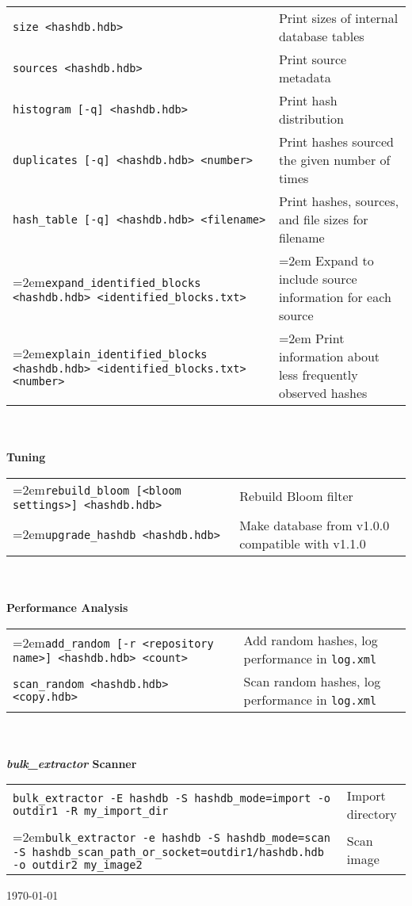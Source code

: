 \documentclass[12pt]{article}
\newcommand{\bulk}{\emph{bulk\_extractor}\xspace}
\begin{document}
\begin{tabular}{p{3.6 in} p{3.6 in}}
\small\small\texttt{size <hashdb.hdb>} & Print sizes of internal database tables \\
\small\texttt{sources <hashdb.hdb>} & Print source metadata \\
\small\texttt{histogram [-q] <hashdb.hdb>} & Print hash distribution \\
\small\texttt{duplicates [-q] <hashdb.hdb> <number>} & Print hashes sourced the given number of times \\
\small\texttt{hash\_table [-q] <hashdb.hdb> <filename>} & Print hashes, sources, and file sizes for filename\\
\hangindent=2em\texttt{expand\_identified\_blocks <hashdb.hdb> <identified\_blocks.txt>} & \hangindent=2em Expand to include source information for each source \\
\hangindent=2em\small\texttt{explain\_identified\_blocks <hashdb.hdb> <identified\_blocks.txt> <number>} & \hangindent=2em Print information about less frequently observed hashes\\
\end{tabular}
\\
\\
\textbf{Tuning}\\
\begin{tabular}{p{3.6 in} p{4 in}}
\hangindent=2em\small\texttt{rebuild\_bloom [<bloom settings>] <hashdb.hdb>} & Rebuild Bloom filter \\
\hangindent=2em\small\texttt{upgrade\_hashdb <hashdb.hdb>} & Make database from v1.0.0 compatible with v1.1.0\\
\end{tabular}
\\
\\
\textbf{Performance Analysis}\\
\begin{tabular}{p{3.6 in} p{4 in}}
\hangindent=2em\small\texttt{add\_random [-r <repository name>] <hashdb.hdb> <count>} & Add random hashes, log performance in \texttt{log.xml}\\
\small\texttt{scan\_random <hashdb.hdb> <copy.hdb>} & Scan random hashes, log performance in \texttt{log.xml}\\
\end{tabular}
\\
\\
\textbf{\bulk Scanner}\\
\begin{tabular}{p{5.8 in} l}
\small\texttt{bulk\_extractor -E hashdb -S hashdb\_mode=import -o outdir1 -R my\_import\_dir} & Import directory\\
\hangindent=2em\small\texttt{bulk\_extractor -e hashdb -S hashdb\_mode=scan -S hashdb\_scan\_path\_or\_socket=outdir1/hashdb.hdb -o outdir2 my\_image2} & Scan image\\
\end{tabular}

\vspace{2mm}
\begin{center}
\begin{footnotesize}
\today
\end{footnotesize}
\end{center}
\end{document}
